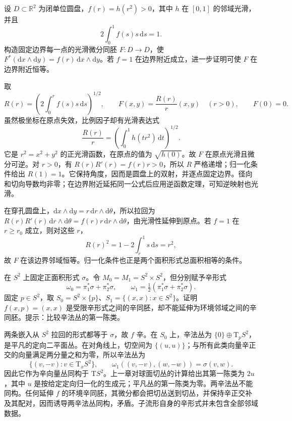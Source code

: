 \begin{exercise}\label{g4:ex:0802:radial-disc}
	设 \(D\subset\mathbb R^2\) 为闭单位圆盘，\(f(r)=h(r^2)>0\)，其中 \(h\) 在 \([0,1]\) 的邻域光滑，并且
	\[
		2\int_0^1f(s)s\,\mathrm{d}s=1.
	\]
	构造固定边界每一点的光滑微分同胚 \(F:D\to D\)，使 \(F^*(\mathrm{d}x\wedge\mathrm{d}y)=f(r)\,\mathrm{d}x\wedge\mathrm{d}y\)。若 \(f=1\) 在边界附近成立，进一步证明可使 \(F\) 在边界附近恒等。
\end{exercise}
\begin{solution}
	取
	\[
		R(r)=\left(2\int_0^r f(s)s\,\mathrm{d}s\right)^{1/2},
		\qquad F(x,y)=\frac{R(r)}r(x,y)\quad(r>0),\qquad F(0)=0.
	\]
	虽然极坐标在原点失效，比例因子却有光滑表达式
	\[
		\frac{R(r)}r=\left(\int_0^1h(tr^2)\,\mathrm{d}t\right)^{1/2}.
	\]
	它是 \(r^2=x^2+y^2\) 的正光滑函数，在原点的值为 \(\sqrt{h(0)}\)。故 \(F\) 在原点光滑且微分可逆。对 \(r>0\)，有 \(R(r)R'(r)=f(r)r>0\)，所以 \(R\) 严格递增；归一化条件给出 \(R(1)=1\)。它保持角度，因而是圆盘上的双射，并逐点固定边界。径向和切向导数均非零；在边界附近延拓同一公式后应用逆函数定理，可知逆映射也光滑。

	在穿孔圆盘上，\(\mathrm{d}x\wedge\mathrm{d}y=r\,\mathrm{d}r\wedge\mathrm{d}\theta\)，所以拉回为 \(R(r)R'(r)\,\mathrm{d}r\wedge\mathrm{d}\theta=f(r)r\,\mathrm{d}r\wedge\mathrm{d}\theta\)，由光滑性延伸到原点。若 \(f=1\) 在 \(r\ge r_0\) 成立，则对这些 \(r\)，
	\[
		R(r)^2=1-2\int_r^1s\,\mathrm{d}s=r^2,
	\]
	故 \(F\) 在该边界邻域恒等。归一化条件也正是两个面积形式总面积相等的条件。
\end{solution}

\begin{exercise}\label{g4:ex:0803:normal-obstruction}
	在 \(S^2\) 上固定正面积形式 \(\sigma\)。令 \(M_0=M_1=S^2\times S^2\)，但分别赋予辛形式
	\[
		\omega_0=\pi_1^*\sigma+\pi_2^*\sigma,
		\qquad\omega_1=\tfrac12(\pi_1^*\sigma+\pi_2^*\sigma).
	\]
	固定 \(p\in S^2\)，取 \(S_0=S^2\times\{p\}\)、\(S_1=\{(x,x):x\in S^2\}\)。证明 \(f(x,p)=(x,x)\) 是受限辛形式之间的辛同胚，却不能延伸为环境邻域之间的辛同胚。提示：比较辛法丛的第一陈类。
\end{exercise}
\begin{solution}
	两条嵌入从 \(S^2\) 拉回的形式都等于 \(\sigma\)，故 \(f\) 辛。在 \(S_0\) 上，辛法丛为 \(\{0\}\oplus\mathrm{T}_pS^2\)，是平凡的定向二平面丛。在对角线上，切空间为 \(\{(u,u)\}\)；与所有此类向量辛正交的向量满足两分量之和为零，所以辛法丛为
	\[
		\{(v,-v):v\in\mathrm{T}_xS^2\},\qquad
		\omega_1((v,-v),(w,-w))=\sigma(v,w).
	\]
	因此它作为辛向量丛同构于 \(\mathrm{T}S^2\)。上一章对球面切丛的计算给出其第一陈类为 \(2u\)，其中 \(u\) 是按给定定向归一化的生成元；平凡丛的第一陈类为零。两辛法丛不能同构。任何延伸 \(f\) 的环境辛同胚，其微分都会把切丛送到切丛，并保持辛正交补及其配对，因而诱导两辛法丛同构，矛盾。子流形自身的辛形式并未包含全部邻域数据。
\end{solution}

